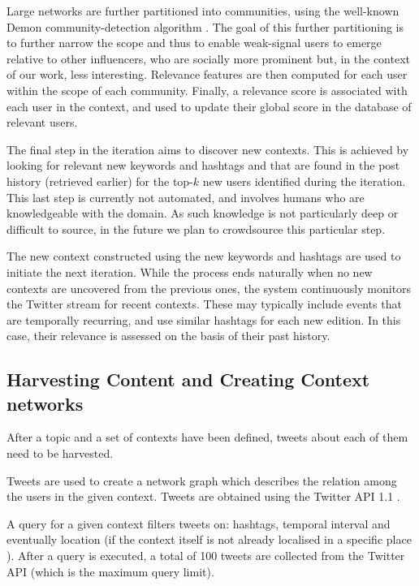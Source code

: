 \documentclass[runningheads]{llncs}
\begin{document}
Large networks are further partitioned into communities, using the well-known Demon community-detection algorithm \cite{DEMON}.
%
The goal of this further partitioning is to further narrow the scope and thus to enable weak-signal users to emerge relative to other influencers, who are socially more prominent but, in the context of our work, less interesting.
Relevance features are then computed for each user within the scope of each community. 
Finally, a relevance score is associated with each user in the context, and used to update their global score in the database of relevant users.

The final step in the iteration aims to discover new contexts. 
This is achieved by looking for relevant new keywords and hashtags and that are found in the post history (retrieved earlier) for the top-$k$ new users identified during the iteration. 
This last step is currently not automated, and involves humans who are knowledgeable with the domain. 
As such knowledge is not particularly deep or difficult to source, in the future we plan to crowdsource this particular step.

The new context constructed using the new keywords and hashtags are used to initiate the next iteration. 
While the process ends naturally when no new contexts are uncovered from the previous ones, the system continuously monitors the Twitter stream for recent contexts. These may typically include events that are temporally recurring, and use similar hashtags for each new edition. In this case, their relevance is assessed on the basis of their past history.


\subsection{Harvesting Content and Creating Context networks}  \label{sec:harvesting}
After a topic and a set of contexts have been defined, tweets about each of them need to be harvested.

Tweets are used to create a network graph which describes the relation among the users in the given context. Tweets are obtained using the Twitter API 1.1 .

A query for a given context filters tweets on: hashtags, temporal interval and eventually location (if the context itself is not already localised in a specific place ).
After a query is executed, a total of 100 tweets are collected from the Twitter API (which is the maximum query limit).
\end{document}
